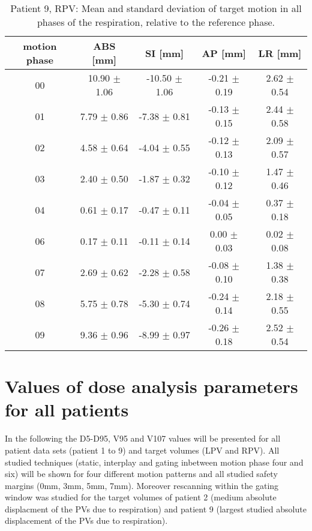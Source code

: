 \begin{table}[H]
  \centering
  \caption{Patient 9, RPV: Mean and standard deviation of target motion in all phases of the respiration, relative to the reference phase.}
  \begin{tabular}{|c|c|c|c|c|}
    \hline\hline
    motion phase & ABS [mm] & SI [mm] & AP [mm] & LR [mm]\\
    \hline 
00& 10.90 $\pm$ 1.06& -10.50 $\pm$ 1.06& -0.21 $\pm$ 0.19& 2.62 $\pm$ 0.54 \\
01& 7.79 $\pm$ 0.86& -7.38 $\pm$ 0.81& -0.13 $\pm$ 0.15& 2.44 $\pm$ 0.58 \\
02& 4.58 $\pm$ 0.64& -4.04 $\pm$ 0.55& -0.12 $\pm$ 0.13& 2.09 $\pm$ 0.57 \\
03& 2.40 $\pm$ 0.50& -1.87 $\pm$ 0.32& -0.10 $\pm$ 0.12& 1.47 $\pm$ 0.46 \\
04& 0.61 $\pm$ 0.17& -0.47 $\pm$ 0.11& -0.04 $\pm$ 0.05& 0.37 $\pm$ 0.18 \\
06& 0.17 $\pm$ 0.11& -0.11 $\pm$ 0.14& 0.00 $\pm$ 0.03& 0.02 $\pm$ 0.08 \\
07& 2.69 $\pm$ 0.62& -2.28 $\pm$ 0.58& -0.08 $\pm$ 0.10& 1.38 $\pm$ 0.38 \\
08& 5.75 $\pm$ 0.78& -5.30 $\pm$ 0.74& -0.24 $\pm$ 0.14& 2.18 $\pm$ 0.55 \\
09& 9.36 $\pm$ 0.96& -8.99 $\pm$ 0.97& -0.26 $\pm$ 0.18& 2.52 $\pm$ 0.54 \\
        \hline\hline
  \end{tabular}
\end{table}



\section{Values of dose analysis parameters for all patients}
 In the following the D5-D95, V95 and V107 values will be presented for all patient data sets (patient 1 to 9) and target volumes (LPV 
 and RPV). All studied techniques (static, interplay and gating inbetween motion phase four and six) will be shown for 
 four different motion patterns and all studied safety margins (0mm, 3mm, 5mm, 7mm). Moreover rescanning within the gating window was studied 
 for the target volumes of patient 2 (medium absolute displacment of the PVs due to respiration) and patient 9 
 (largest studied absolute displacement of the PVs due to respiration). 

\newpage

